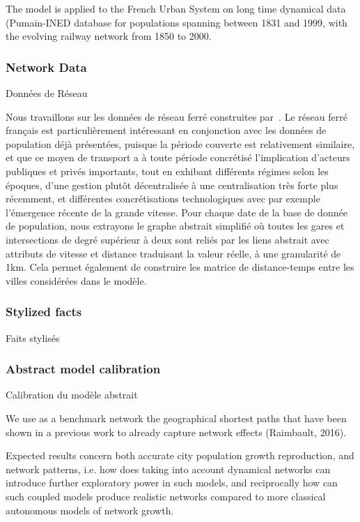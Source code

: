 The model is applied to the French Urban System on long time dynamical data (Pumain-INED database for populations spanning between 1831 and 1999, with the evolving railway network from 1850 to 2000.




\subsubsection{Network Data}{Données de Réseau}

Nous travaillons sur les données de réseau ferré construites par~\cite{thevenin2013mapping}. Le réseau ferré français est particulièrement intéressant en conjonction avec les données de population déjà présentées, puisque la période couverte est relativement similaire, et que ce moyen de transport a à toute période concrétisé l'implication d'acteurs publiques et privés importants, tout en exhibant différents régimes selon les époques, d'une gestion plutôt décentralisée à une centralisation très forte plus récemment, et différentes concrétisations technologiques avec par exemple l'émergence récente de la grande vitesse. Pour chaque date de la base de donnée de population, nous extrayons le graphe abstrait simplifié où toutes les gares et intersections de degré supérieur à deux sont reliés par les liens abstrait avec attributs de vitesse et distance traduisant la valeur réelle, à une granularité de 1km. Cela permet également de construire les matrice de distance-temps entre les villes considérées dans le modèle.



\subsubsection{Stylized facts}{Faits stylisés}








\subsubsection{Abstract model calibration}{Calibration du modèle abstrait}


We use as a benchmark network the geographical shortest paths that have been shown in a previous work to already capture network effects (Raimbault, 2016).


Expected results concern both accurate city population growth reproduction, and network patterns, i.e. how does taking into account dynamical networks can introduce further exploratory power in such models, and reciprocally how can such coupled models produce realistic networks compared to more classical autonomous models of network growth.

